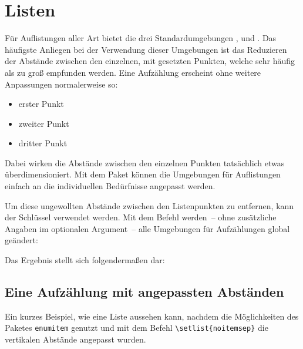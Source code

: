 \documentclass[%
  english,ngerman,%
  geometry=no,DIV=12,automark,%
]{tudscrartcl}
\begin{document}
\section{Listen}
\label{sec:lists}
Für Auflistungen aller Art bietet  die drei Standardumgebungen 
,  und . 
Das häufigste Anliegen bei der Verwendung dieser Umgebungen ist das Reduzieren 
der Abstände zwischen den einzelnen, mit  gesetzten Punkten, welche 
sehr häufig als zu groß empfunden werden. Eine Aufzählung erscheint ohne 
weitere Anpassungen normalerweise so:
%
\begin{Hint*}
\begin{itemize}
\item erster Punkt
\item zweiter Punkt
\item dritter Punkt
\end{itemize}
\end{Hint*}
%
Dabei wirken die Abstände zwischen den einzelnen Punkten tatsächlich etwas 
überdimensioniert. Mit dem Paket  können die Umgebungen für 
Auflistungen einfach an die individuellen Bedürfnisse angepasst werden. 
%
\begin{Preamble}
\usepackage{enumitem}
\end{Preamble}
Um diese ungewollten Abstände zwischen den Listenpunkten zu entfernen, kann der 
Schlüssel  verwendet werden. Mit dem Befehl  
werden~-- ohne zusätzliche Angaben im optionalen Argument~-- alle Umgebungen 
für Aufzählungen global geändert:
\begin{Preamble*}

\end{Preamble*}
%
Das Ergebnis stellt sich folgendermaßen dar:
%
\begin{Trunk+}
\section{Eine Aufzählung mit angepassten Abständen}
Ein kurzes Beispiel, wie eine Liste aussehen kann, nachdem die 
Möglichkeiten des Paketes \texttt{enumitem} genutzt und mit dem 
Befehl \texttt{\textbackslash setlist\{noitemsep\}} die vertikalen 
Abstände angepasst wurden.

\end{Trunk+}
\end{document}
